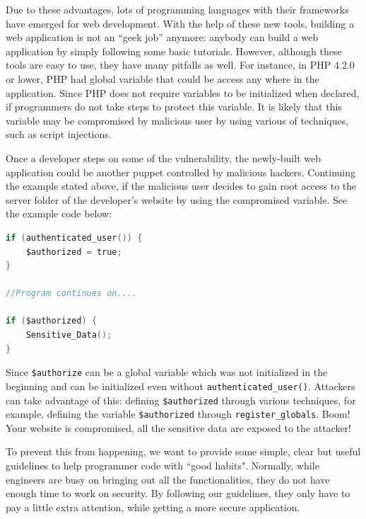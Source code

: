 \documentclass[conference]{IEEEtran}
\begin{document}
Due to these advantages, lots of programming languages with their frameworks have
emerged for web development. With the help of these new tools,
building a web application is not an ``geek job'' anymore:
anybody can build a web application by simply following some basic tutorials.
However, although these tools are easy to use,
they have many pitfalls as well. For instance, in PHP 4.2.0 or lower, PHP had global variable that could be access 
any where in the application. Since PHP does not require variables to be initialized when declared, if programmers
do not take steps to protect this variable. It is likely that this variable may be compromised by malicious user by
using various of techniques, such as script injections.

Once a developer steps on some of the vulnerability, the newly-built web application could
be another puppet controlled by malicious hackers. Continuing the example stated above, if the malicious user
decides to gain root access to the server folder of the developer's website by using the compromised variable. See the example code below:
\begin{lstlisting}[language=C]
if (authenticated_user()) {
    $authorized = true;
}

//Program continues on....

if ($authorized) {
    Sensitive_Data();
}
\end{lstlisting}

Since \texttt{\$authorize} can be a global variable which was not initialized in the beginning and can be initialized even without \texttt{authenticated\_user()}. Attackers
can take advantage of this: defining \texttt{\$authorized} through various techniques, for example, defining the variable \texttt{\$authorized} through \texttt{register\_globals}. 
Boom! Your website is compromised, all the sensitive data are exposed to the attacker!

To prevent this from happening, we want to provide some simple, clear but
useful guidelines to help programmer code with ``good habits".
Normally, while engineers are busy on bringing out all the functionalities,
they do not have enough time to work on security. By following our guidelines,
they only have to pay a little extra attention, while getting a more secure application.
\end{document}
